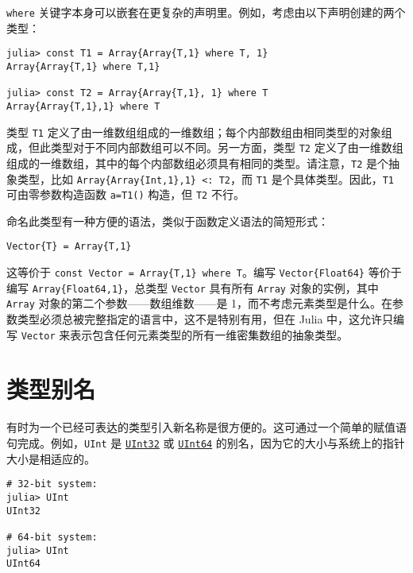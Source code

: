 \texttt{where} 关键字本身可以嵌套在更复杂的声明里。例如，考虑由以下声明创建的两个类型：




\begin{verbatim}
julia> const T1 = Array{Array{T,1} where T, 1}
Array{Array{T,1} where T,1}

julia> const T2 = Array{Array{T,1}, 1} where T
Array{Array{T,1},1} where T
\end{verbatim}



类型 \texttt{T1} 定义了由一维数组组成的一维数组；每个内部数组由相同类型的对象组成，但此类型对于不同内部数组可以不同。另一方面，类型 \texttt{T2} 定义了由一维数组组成的一维数组，其中的每个内部数组必须具有相同的类型。请注意，\texttt{T2} 是个抽象类型，比如 \texttt{Array\{Array\{Int,1\},1\} <: T2}，而 \texttt{T1} 是个具体类型。因此，\texttt{T1} 可由零参数构造函数 \texttt{a=T1()} 构造，但 \texttt{T2} 不行。



命名此类型有一种方便的语法，类似于函数定义语法的简短形式：




\begin{verbatim}
Vector{T} = Array{T,1}
\end{verbatim}



这等价于 \texttt{const Vector = Array\{T,1\} where T}。编写 \texttt{Vector\{Float64\}} 等价于编写 \texttt{Array\{Float64,1\}}，总类型 \texttt{Vector} 具有所有 \texttt{Array} 对象的实例，其中 \texttt{Array} 对象的第二个参数——数组维数——是 1，而不考虑元素类型是什么。在参数类型必须总被完整指定的语言中，这不是特别有用，但在 Julia 中，这允许只编写 \texttt{Vector} 来表示包含任何元素类型的所有一维密集数组的抽象类型。



\hypertarget{11325503690546832900}{}


\section{类型别名}



有时为一个已经可表达的类型引入新名称是很方便的。这可通过一个简单的赋值语句完成。例如，\texttt{UInt} 是 \hyperlink{8690996847580776341}{\texttt{UInt32}} 或 \hyperlink{5500998675195555601}{\texttt{UInt64}} 的别名，因为它的大小与系统上的指针大小是相适应的。




\begin{verbatim}
# 32-bit system:
julia> UInt
UInt32

# 64-bit system:
julia> UInt
UInt64
\end{verbatim}



